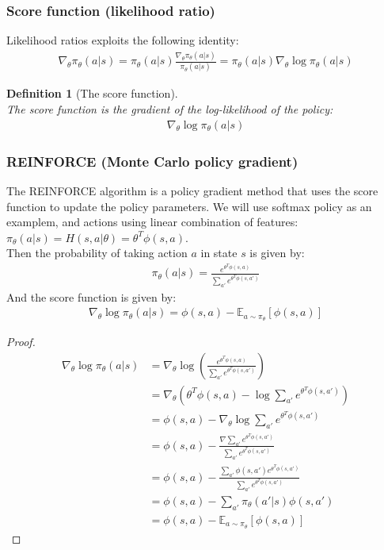 \documentclass[11pt]{book} %
\newtheorem{definition}{Definition}[section]
\begin{document}
\subsubsection{Score function (likelihood ratio)}
Likelihood ratios exploits the following identity:
\begin{align*}
    \nabla_{\theta} \pi_{\theta}(a|s) = \pi_{\theta}(a|s)\frac{\nabla_{\theta} \pi_{\theta}(a|s)}{\pi_{\theta}(a|s)} = \pi_{\theta}(a|s) \nabla_{\theta} \log \pi_{\theta}(a|s)
\end{align*}

\begin{definition}[The score function]\ \\
    The score function is the gradient of the log-likelihood of the policy:
    \begin{align*}
        \nabla_{\theta} \log \pi_{\theta}(a|s)
    \end{align*}
\end{definition}


\subsubsection{REINFORCE (Monte Carlo policy gradient)}
The REINFORCE algorithm is a policy gradient method that uses the score function to update the policy parameters.
We will use softmax policy as an examplem, and actions using linear combination of features: $\pi_\theta(a|s) = H(s, a |\theta) = \theta^T \phi(s, a)$. \\
Then the probability of taking action $a$ in state $s$ is given by:
\begin{align*}
    \pi_{\theta}(a|s) = \frac{e^{\theta^T \phi(s, a)}}{\sum_{a'} e^{\theta^T \phi(s, a')}}
\end{align*}
And the score function is given by:
\begin{align*}
    \nabla_{\theta} \log \pi_{\theta}(a|s) = \phi(s, a) - \mathbb{E}_{a \sim \pi_{\theta}}[\phi(s, a)]
\end{align*}

\begin{proof}
    \begin{align*}
        \nabla_{\theta} \log \pi_{\theta}(a|s) &= \nabla_{\theta} \log \left( \frac{e^{\theta^T \phi(s, a)}}{\sum_{a'} e^{\theta^T \phi(s, a')}} \right) \\
        &= \nabla_{\theta} \left( \theta^T \phi(s, a) - \log \sum_{a'} e^{\theta^T \phi(s, a')} \right) \\
        &= \phi(s, a) - \nabla_{\theta} \log \sum_{a'} e^{\theta^T \phi(s, a')} \\
        &= \phi(s, a) - \frac{\nabla \sum_{a'} e^{\theta^T \phi(s, a')}}{\sum_{a'} e^{\theta^T \phi(s, a')}} \\
        &= \phi(s, a) - \frac{\sum_{a'} \phi(s, a') e^{\theta^T \phi(s, a')}}{\sum_{a'} e^{\theta^T \phi(s, a')}} \\
        &= \phi(s, a) - \sum_{a'} \pi_{\theta}(a'|s) \phi(s, a') \\
        &= \phi(s, a) - \mathbb{E}_{a \sim \pi_{\theta}}[\phi(s, a)]
    \end{align*}
\end{proof}
\end{document}
